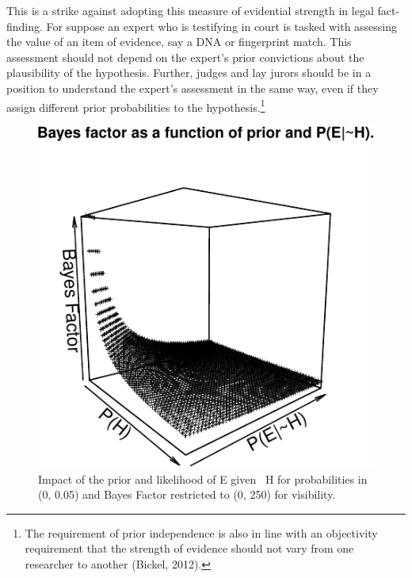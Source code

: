 \documentclass[
  10pt,
  dvipsnames,enabledeprecatedfontcommands]{scrartcl}
\begin{document}
This is a strike against adopting this measure of evidential strength in
legal fact-finding. For suppose an expert who is testifying in court is
tasked with assessing the value of an item of evidence, say a DNA or
fingerprint match. This assessment should not depend on the expert's
prior convictions about the plausibility of the hypothesis. Further,
judges and lay jurors should be in a position to understand the expert's
assessment in the same way, even if they assign different prior
probabilities to the hypothesis.\footnote{The requirement of prior
  independence is also in line with an objectivity requirement that the
  strength of evidence should not vary from one researcher to another
  (Bickel, 2012).}

\footnotesize

\normalsize

\begin{figure}


\begin{center}\includegraphics[width=1\linewidth]{lr-chapter6_files/figure-latex/fig-BayesFactorPrior-1} \end{center}
\caption{Impact of the prior and likelihood of E given ~H for probabilities in (0, 0.05) and Bayes Factor restricted to (0, 250) for visibility.}
\label{fig:BayesFactorPrior}
\end{figure}
\end{document}

